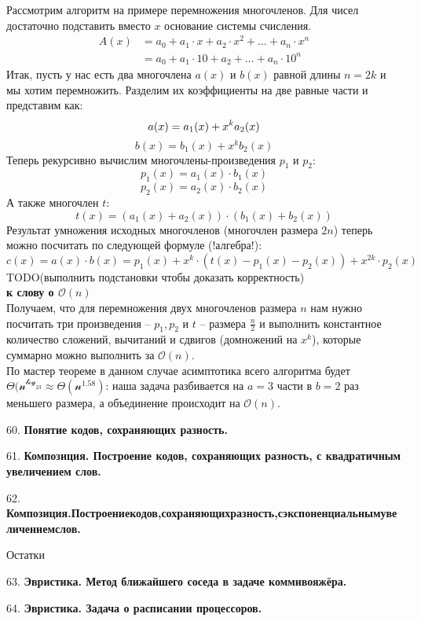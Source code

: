 \documentclass[12pt]{article}
\begin{document}
Рассмотрим алгоритм на примере перемножения многочленов. Для чисел достаточно подставить вместо $x$ основание системы счисления. 
\[
\begin{array}{cl}
    A(x) & = a_0 + a_1 \cdot x + a_2 \cdot x^2 + \dots + a_n \cdot x^n\\
     & = a_0 + a_1 \cdot 10 + a_2 + \dots + a_n \cdot 10^n
\end{array}
\]
Итак, пусть у нас есть два многочлена $a(x)$ и $b(x)$ равной длины $n = 2k$ и мы хотим перемножить. Разделим их коэффициенты на две равные части и представим как:
\[
    a(x) = a_1(x) + x^ka_2(x)\\
\]
\[
    b(x) = b_1(x) + x^kb_2(x)
\]
Теперь рекурсивно вычислим многочлены-произведения $p_1$ и $p_2$:
\[
    p_1(x) = a_1(x)\cdot b_1(x)
\]
\[
    p_2(x) = a_2(x) \cdot b_2(x)
\]
А также многочлен $t$:
\[
    t(x) = (a_1(x) + a_2(x)) \cdot (b_1(x) + b_2(x))
\]
Результат умножения исходных многочленов (многочлен размера $2n$) теперь можно посчитать по следующей формуле (!алгебра!):
\[
    c(x) = a(x)\cdot b(x) = p_1(x) + x^k\cdot (t(x) - p_1(x) - p_2(x)) + x^{2k} \cdot p_2(x)
\]
TODO(выполнить подстановки чтобы доказать корректность)
\\\textbf{к слову о $\mathcal{O}(n)$}\\
Получаем, что для перемножения двух многочленов размера $n$ нам нужно посчитать три произведения -- $p_1, p_2$ и $t$ -- размера $\frac{n}{2}$ и выполнить константное количество сложений, вычитаний и сдвигов (домножений на $x^k$), которые суммарно можно выполнить за $\mathcal{O}(n)$.\\

По мастер теореме в данном случае асимптотика всего алгоритма будет $\mathcal{\Theta(n^{\log_23}} \approx \mathcal{\Theta(n^{1.58})}$: наша задача разбивается на $a = 3$ части в $b = 2$ раз меньшего размера, а объединение происходит на $\mathcal{O}(n)$. 

60. \textbf{Понятие кодов, сохраняющих разность.}

61. \textbf{Композиция. Построение кодов, сохраняющих разность, с квадратичным увеличением слов.}

62. \textbf{Композиция.Построениекодов,сохраняющихразность,сэкспоненциальнымувеличениемслов.}

\begin{center}
    Остатки
\end{center}

63. \textbf{Эвристика. Метод ближайшего соседа в задаче коммивояжёра.}

64. \textbf{Эвристика. Задача о расписании процессоров.}
\end{document}
